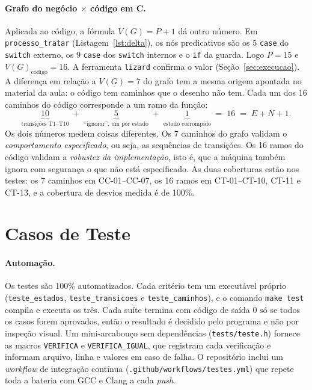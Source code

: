 \documentclass[11pt,a4paper]{article}
\theoremstyle{definition}
\newcommand{\VG}{V(G)}
\begin{document}
\paragraph{Grafo do negócio $\times$ código em C.}\label{sec:grafo-codigo} Aplicada ao código, a
fórmula $\VG = P + 1$ dá outro número. Em \texttt{processo\_tratar} (Listagem~\ref{lst:delta}), os
nós predicativos são os 5 \texttt{case} do \texttt{switch} externo, os 9 \texttt{case} dos
\texttt{switch} internos e o \texttt{if} da guarda. Logo $P = 15$ e $\VG_{\text{código}} = 16$. A
ferramenta \texttt{lizard} confirma o valor (Seção~\ref{sec:execucao}). A diferença em relação a
$\VG = 7$ do grafo tem a mesma origem apontada no material da aula: o código tem caminhos que o
desenho não tem. Cada um dos 16 caminhos do código corresponde a um ramo da função:
\[
  \underbrace{10}_{\text{transições T1--T10}} \;+\; \underbrace{5}_{\text{``ignorar'', um por estado}}
  \;+\; \underbrace{1}_{\text{estado corrompido}} \;=\; 16 \;=\; E + N + 1.
\]
Os dois números medem coisas diferentes. Os 7 caminhos do grafo validam o \emph{comportamento
especificado}, ou seja, as sequências de transições. Os 16 ramos do código validam a
\emph{robustez da implementação}, isto é, que a máquina também ignora com segurança o que não está
especificado. As duas coberturas estão nos testes: os 7 caminhos em CC-01--CC-07, os 16 ramos em
CT-01--CT-10, CT-11 e CT-13, e a cobertura de desvios medida é de 100\%.

\section{Casos de Teste}\label{sec:testes}

\paragraph{Automação.} Os testes são 100\% automatizados. Cada critério tem um executável próprio
(\texttt{teste\_estados}, \texttt{teste\_transicoes} e \texttt{teste\_caminhos}), e o comando
\texttt{make test} compila e executa os três. Cada suíte termina com código de saída 0 só se todos
os casos forem aprovados, então o resultado é decidido pelo programa e não por inspeção visual. Um
mini-arcabouço sem dependências (\texttt{tests/teste.h}) fornece as macros \texttt{VERIFICA} e
\texttt{VERIFICA\_IGUAL}, que registram cada verificação e informam arquivo, linha e valores em caso
de falha. O repositório inclui um \emph{workflow} de integração contínua
(\texttt{.github/workflows/testes.yml}) que repete toda a bateria com GCC e Clang a cada
\emph{push}.
\end{document}
